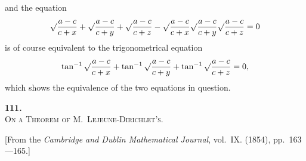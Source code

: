 \documentclass[11pt,a4paper]{book}
\begin{document}
and the equation
\[
\surd\frac{a-c}{c+x} + \surd\frac{a-c}{c+y} + \surd\frac{a-c}{c+z}
- \surd\frac{a-c}{c+x}\surd\frac{a-c}{c+y}\surd\frac{a-c}{c+z} = 0
\]
is of course equivalent to the trigonometrical equation
\[
\tan^{-1}\surd\frac{a-c}{c+x} + \tan^{-1}\surd\frac{a-c}{c+y} + \tan^{-1}\surd\frac{a-c}{c+z} = 0,
\]
which shows the equivalence of the two equations in question.


\newpage
\setcounter{page}{47}

\begin{center}
{\Large\bfseries 111.}\\[0.5em]
{\large\scshape On a Theorem of M.~Lejeune-Dirichlet's.}
\end{center}
\vspace{0.3em}
\begin{center}
\small [From the \textit{Cambridge and Dublin Mathematical Journal}, vol.~IX. (1854), pp.~163---165.]
\end{center}
\vspace{0.5em}
\end{document}
